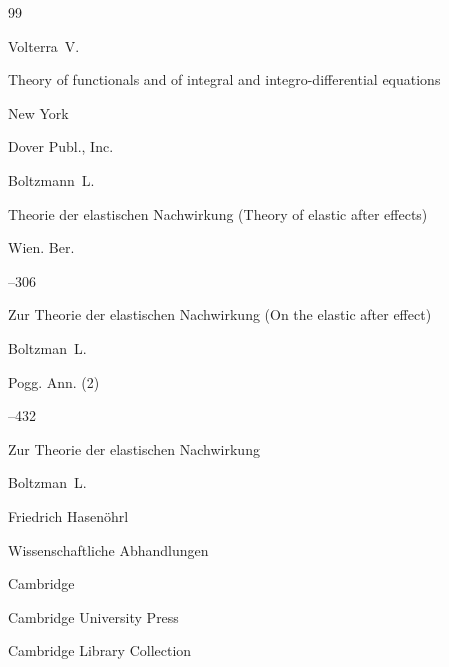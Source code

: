 \documentclass[11pt,a4paper,twoside]{article}
\begin{document}
\begin{thebibliography}{99}







\by Volterra~V.


\book Theory of functionals and of integral and integro-differential equations


\publaddr New York


\publ Dover Publ., Inc. 













\by Boltzmann~L.


\paper Theorie der elastischen Nachwirkung (Theory of elastic after effects)




\jour Wien. Ber.






–306\!\!


\moreref


\paper 	Zur Theorie der elastischen Nachwirkung (On the elastic after effect)


\by    Boltzman~L.




\jour Pogg. Ann. \rm (2)




--432\!\! 




\moreref


\paper 	Zur Theorie der elastischen Nachwirkung 


\by    Boltzman~L.


\ed  Friedrich Hasen\"ohrl


\inbook Wissenschaftliche Abhandlungen




\publaddr Cambridge


\publ Cambridge University Press




\serial Cambridge Library Collection



\end{thebibliography}
\end{document}
